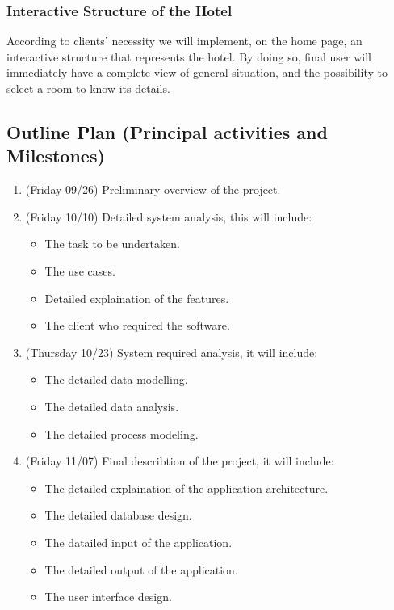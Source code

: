 \subsubsection{Interactive Structure of the Hotel}
	
According to clients’ necessity we will implement, on the home page, an interactive structure that represents the hotel. 
By doing so, final user will immediately have a complete view of general situation, and the possibility to select a room to know its details.

\subsection{Outline Plan (Principal activities and Milestones)}

\begin{enumerate}

\item (Friday 09/26) Preliminary overview of the project.

\item (Friday 10/10) Detailed system analysis, this will include:
	\begin{itemize}
		\item The task to be undertaken.
		\item The use cases.
		\item Detailed explaination of the features.
		\item The client who required the software.
	\end{itemize}

\item (Thursday 10/23) System required analysis, it will include:
  \begin{itemize}
    \item The detailed data modelling.
    \item The detailed data analysis.
    \item The detailed process modeling. 
  \end{itemize}

\item (Friday 11/07) Final describtion of the project, it will include:
  \begin{itemize}
    \item The detailed explaination of the application architecture.
    \item The detailed database design.
    \item The datailed input of the application.
    \item The detailed output of the application.
    \item The user interface design.
\end{itemize}

\end{enumerate}


